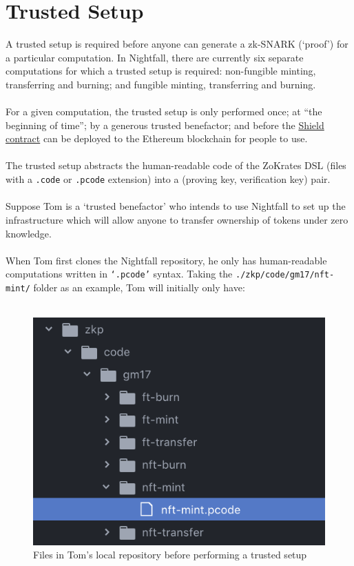 \documentclass{article}
\begin{document}
\newpage
\section{Trusted Setup}
\label{sec:trustedSetup}

A trusted setup is required before anyone can generate a zk-SNARK (`proof') for a particular computation. In Nightfall, there are currently six separate computations for which a trusted setup is required: non-fungible minting, transferring and burning; and fungible minting, transferring and burning.\\
\\
For a given computation, the trusted setup is only performed once; at ``the beginning of time''; by a generous trusted benefactor; and before the \hyperref[sec:smartContracts]{Shield contract} can be deployed to the Ethereum blockchain for people to use.\\
\\
The trusted setup abstracts the human-readable code of the ZoKrates DSL (files with a \texttt{.code} or \texttt{.pcode} extension) into a (proving key, verification key) pair.\\
\\
Suppose Tom is a `trusted benefactor' who intends to use Nightfall to set up the infrastructure which will allow anyone to transfer ownership of tokens under zero knowledge.\\
\\
When Tom first clones the Nightfall repository, he only has human-readable computations written in \texttt{`.pcode'} syntax. Taking the \texttt{./zkp/code/gm17/nft-mint/} folder as an example, Tom will initially only have:\\
\\

\begin{figure}[H]
  \centering
  \includegraphics[scale=0.65]{files-before-setup.png}
  \caption{Files in Tom's local repository before performing a trusted setup}
  \label{pic:filesBeforeSetup}
\end{figure}
\end{document}

